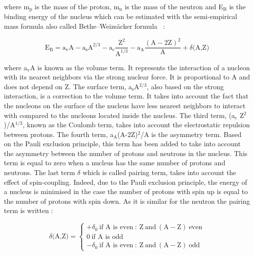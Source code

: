 \documentclass[main.tex]{subfiles}
\begin{document}
\NI where m$_\text{p}$ is the mass of the proton, m$_\text{n}$ is the mass of the neutron and E$_\text{B}$ is the binding energy of the nucleus which can be estimated with the semi-empirical mass formula also called Bethe–Weizsäcker formula~\cite{WeizsckerFormula} :  


\begin{equation}\label{eq:EB}
\text{E}_\text{B} = \text{a}_\text{v} \text{A} - \text{a}_\text{s} \text{A}^{\text{2/3}} -  \text{a}_\text{c} \frac{\text{Z}^\text{2}}{\text{A}^{\text{1/3}}} - \text{a}_\text{A} \frac{(\text{A}-\text{2Z})^\text{2}}{\text{A}} + \delta \text{(A,Z)} 
\end{equation}


\bigskip


\NI where a$_\text{v}$A is known as the volume term. It represents the interaction of a nucleon with its nearest neighbors via the strong nuclear force. It is proportional to A and does not depend on Z. The surface term, a$_\text{s}$A$^{\text{2/3}}$, also based on the strong interaction, is a correction to the volume term. It takes into account the fact that the nucleons on the surface of the nucleus have less nearest neighbors to interact with compared to the nucleons located inside the nucleus. The third term, (a$_\text{c}$ Z$^\text{2}$)/A$^{\text{1/3}}$, known as the Coulomb term, takes into account the electrostatic repulsion between protons. The fourth term, a$_\text{A}$(A-2Z)$^\text{2}$/A is the asymmetry term. Based on the Pauli exclusion principle, this term has been added to take into account the asymmetry between the number of protons and neutrons in the nucleus. This term is equal to zero when a nucleus has the same number of protons and neutrons. The last term $\delta$ which is called pairing term, takes into account the effect of spin-coupling. Indeed, due to the Pauli exclusion principle, the energy of a nucleus is minimised in the case the number of protons with spin up is equal to the number of protons with spin down. As it is similar for the neutron the pairing term is written : 


\begin{equation}
\delta \text{(A,Z)} = 
\left\{
\begin{array}{l}
  +\delta_0~\text{if~A is even}~:~\text{Z}~\text{and}~(\text{A}-\text{Z})~\text{even} \\[0.5cm]
  \text{0}~\text{if~A~is odd}\\[0.5cm]
  -\delta_0~\text{if~A is even}~:~\text{Z}~\text{and}~(\text{A}-\text{Z})~\text{odd}
\end{array}
\right.
\end{equation}
\end{document}
